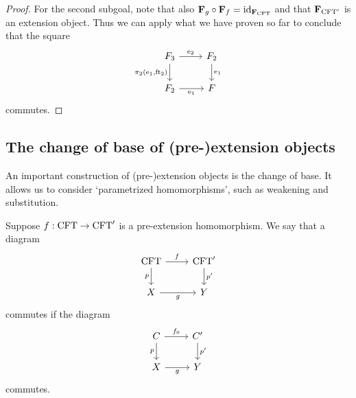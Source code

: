 \begin{proof}
For the second subgoal, note that also $\mathbf{F}_{g}\circ\mathbf{F}_{f}=
{\mathrm{id}_{\mathbf{F}_{\mathrm{CFT}}}}$ and that $\mathbf{F}_{\mathrm{CFT}'}$ is an extension object.
Thus we can apply what we have proven so far to conclude that the square
\begin{equation*}
\begin{tikzcd}
\stesysf_3 
  \ar{r}{\eext{2}} 
  \ar{d}[swap]{\pullbackpr{2}{\efamext}{\eft[2]}} 
  & 
\stesysf_2 
  \ar{d}{\efamext}
  \\
\stesysf_2
  \ar{r}[swap]{\efamext} 
  & 
\stesysf
\end{tikzcd}
\end{equation*}
commutes.
\end{proof}

\subsection{The change of base of (pre-)extension objects}
\label{subsection:change_of_base}
An important construction of (pre-)extension objects is the change of base. It
allows us to consider `parametrized homomorphisms', such as weakening and
substitution.

\begin{defn}
Suppose $f:\mathrm{CFT}\to\mathrm{CFT}'$ is a pre-extension homomorphism. We say that
a diagram
\begin{equation*}
\begin{tikzcd}
\stesys
  \ar{r}{f}
  \ar{d}[swap]{p}
  &
\stesys'
  \ar{d}{p'}
  \\
X \ar{r}[swap]{g}
  &
Y
\end{tikzcd}
\end{equation*}
commutes if the diagram
\begin{equation*}
\begin{tikzcd}
\stesysc
  \ar{r}{f_0}
  \ar{d}[swap]{p}
  &
\stesysc'
  \ar{d}{p'}
  \\
X \ar{r}[swap]{g}
  &
Y
\end{tikzcd}
\end{equation*}
commutes.
\end{defn}

